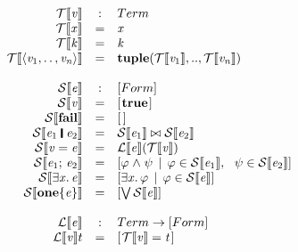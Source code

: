 \documentclass[acmsmall,review,dvipsnames]{acmart}
\newcommand{\Varid}[1]{\mathit{#1}}
\newcommand{\vb}{\; \ensuremath{\mathop{\mid}} \;}    %
\newcommand{\Term}{Term}
\newcommand{\Forml}{Form}
\newcommand{\lcompr}[2]{[ #1 \vb #2 ]}
\newcommand{\semfun}[1]{\mathcal{#1}}
\newcommand{\folapp}[2]{\semfun{L}\llbracket #1 \rrbracket #2}
\newcommand{\sfolapp}[2]{\semfun{S}\llbracket #1 \rrbracket #2}
\newcommand{\termapp}[2]{\semfun{T}\llbracket #1 \rrbracket #2}
\begin{document}
\begin{figure}
$$
  \begin{array}{rcll}
  \termapp{\ensuremath{\Varid{v}}} & : & \Term \\
  \termapp{\ensuremath{\Varid{x}}} & = & \ensuremath{\Varid{x}} \\
  \termapp{\ensuremath{\Varid{k}}} & = & \ensuremath{\Varid{k}} \\
  \termapp{\ensuremath{\langle{}\Varid{v}_{\mathrm{1}},\mathinner{\ldotp\ldotp},\Varid{v}_{\Varid{n}}\rangle}} & = & \mathbf{tuple}(\termapp{\ensuremath{\Varid{v}_{\mathrm{1}}}},..,\termapp{\ensuremath{\Varid{v}_{\Varid{n}}}}) \\
~ \\
  \sfolapp{\ensuremath{\Varid{e}}} & : & [\Forml] \\
  \sfolapp{\ensuremath{\Varid{v}}} & = & \ensuremath{[\mskip1.5mu \textbf{true}\mskip1.5mu]} \\
  \sfolapp{\ensuremath{\textbf{fail}}} & = & \ensuremath{[\mskip1.5mu \mskip1.5mu]} \\
  \sfolapp{\ensuremath{\Varid{e}_{\mathrm{1}}\;\rule[-0.1em]{0.15em}{0.75em}\;\Varid{e}_{\mathrm{2}}}} & = &
    \sfolapp{\ensuremath{\Varid{e}_{\mathrm{1}}}} \ensuremath{\bowtie} \sfolapp{\ensuremath{\Varid{e}_{\mathrm{2}}}} \\
  \sfolapp{\ensuremath{\Varid{v}\mathrel{=}\Varid{e}}} & = &
    \folapp{\ensuremath{\Varid{e}}}(\ensuremath{\termapp{\Varid{v}}}) \\
  \sfolapp{\ensuremath{\Varid{e}_{\mathrm{1}};\,\Varid{e}_{\mathrm{2}}}} & = &
    \lcompr{\ensuremath{\varphi\mathrel{\wedge}\psi}}
           {\ensuremath{\varphi} \in \sfolapp{\ensuremath{\Varid{e}_{\mathrm{1}}}}, ~~ \ensuremath{\psi} \in \sfolapp{\ensuremath{\Varid{e}_{\mathrm{2}}}}} \\
  \sfolapp{\ensuremath{\exists\Varid{x}.\,\Varid{e}}} & = &
    \lcompr{\ensuremath{\exists\Varid{x}.\,\varphi}}
           {\ensuremath{\varphi} \in \sfolapp{\ensuremath{\Varid{e}}}} \\
  \sfolapp{\ensuremath{\textbf{one}\{\Varid{e}\}}} & = & [\bigvee{} \sfolapp{\ensuremath{\Varid{e}}}] \\
~ \\
  \folapp{\ensuremath{\Varid{e}}} & : & \Term \rightarrow [\Forml] \\
  \folapp{\ensuremath{\Varid{v}}}{t} & = & \ensuremath{[\mskip1.5mu \termapp{\Varid{v}}\mathrel{=}\Varid{t}\mskip1.5mu]} \\

\end{array}$$
\end{figure}
\end{document}
